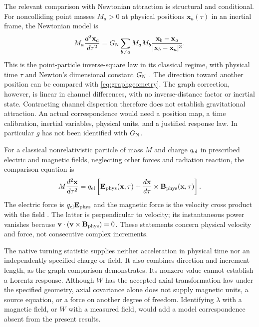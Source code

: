 \documentclass[11pt,a4paper]{article}
\numberwithin{equation}{section}
\theoremstyle{remark}\newtheorem{remark}[theorem]{Remark}
\begin{document}
The relevant comparison with Newtonian attraction is structural and conditional. For noncolliding point masses $M_a>0$ at physical positions $\mathbf x_a(\tau)$ in an inertial frame, the Newtonian model is
\begin{equation}
M_a\frac{d^2\mathbf x_a}{d\tau^2}
=G_{\rm N}\sum_{b\ne a}M_aM_b
\frac{\mathbf x_b-\mathbf x_a}{|\mathbf x_b-\mathbf x_a|^3}.
\label{eq:newton}
\end{equation}
This is the point-particle inverse-square law in its classical regime, with physical time $\tau$ and Newton's dimensional constant $G_{\rm N}$ \cite{newton}. The direction toward another position can be compared with \eqref{eq:graphgeometry}. The graph correction, however, is linear in channel differences, with no inverse-distance factor or inertial state. Contracting channel dispersion therefore does not establish gravitational attraction. An actual correspondence would need a position map, a time calibration, inertial variables, physical units, and a justified response law. In particular $g$ has not been identified with $G_{\rm N}$.

For a classical nonrelativistic particle of mass $M$ and charge $q_{\rm el}$ in prescribed electric and magnetic fields, neglecting other forces and radiation reaction, the comparison equation is
\begin{equation}
M\frac{d^2\mathbf x}{d\tau^2}
=q_{\rm el}\left[\mathbf E_{\rm phys}(\mathbf x,\tau)
+\frac{d\mathbf x}{d\tau}\times\mathbf B_{\rm phys}(\mathbf x,\tau)\right].
\label{eq:lorentz}
\end{equation}
The electric force is $q_{\rm el}\mathbf E_{\rm phys}$ and the magnetic force is the velocity cross product with the field \cite{electric,magnetic}. The latter is perpendicular to velocity; its instantaneous power vanishes because $\mathbf v\cdot(\mathbf v\times\mathbf B_{\rm phys})=0$. These statements concern physical velocity and force, not consecutive complex increments.

The native turning statistic supplies neither acceleration in physical time nor an independently specified charge or field. It also combines direction and increment length, as the graph comparison demonstrates. Its nonzero value cannot establish a Lorentz response. Although $W$ has the accepted axial transformation law under the specified geometry, axial covariance alone does not supply magnetic units, a source equation, or a force on another degree of freedom. Identifying $\lambda$ with a magnetic field, or $W$ with a measured field, would add a model correspondence absent from the present results.
\end{document}
